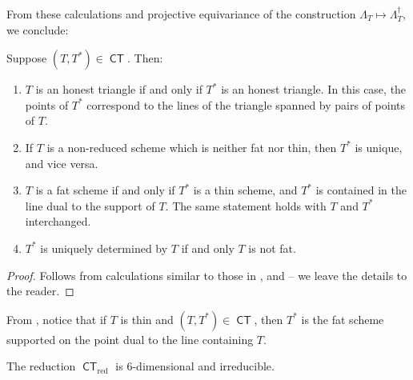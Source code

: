 \documentclass{article}
\DeclareMathOperator{\CT}{\mathsf{CT}}
\DeclareMathOperator{\red}{red}
\begin{document}
From these calculations and projective equivariance of the
construction $\Lambda_{T} \mapsto \Lambda_{T}^{\dagger}$, we conclude:
\begin{proposition}
  \label{proposition:fatandtriple}
  Suppose $(T, T^{*}) \in \CT$. Then:
  \begin{enumerate} 
  \item $T$ is an honest triangle if and only
    if $T^{*}$ is an honest triangle. In this case, the points of
    $T^{*}$ correspond to the lines of the triangle spanned by pairs of points of $T$.

  \item If $T$ is a non-reduced scheme which is neither fat nor thin,
    then $T^{*}$ is unique, and vice versa.

  \item $T$ is a fat scheme if and only if $T^{*}$ is a thin scheme,
    and $T^{*}$ is contained in the line dual to the support of
    $T$. The same statement holds with $T$ and $T^{*}$ interchanged.

    \item $T^{*}$ is uniquely determined by $T$ if and only $T$ is not fat.
\end{enumerate}
\end{proposition}
\begin{proof}
  Follows from calculations similar to those in ,  and  -- we leave the details to the reader.
\end{proof}

\begin{remark}
  From , notice that if $T$ is thin
  and $(T, T^{*}) \in \CT$, then $T^{*}$ is the fat scheme supported
  on the point dual to the line containing $T$.
\end{remark}


\begin{proposition}\label{prop:irreducible}
  The reduction $\CT_{\red}$ is $6$-dimensional and irreducible.
\end{proposition} 
\end{document}
